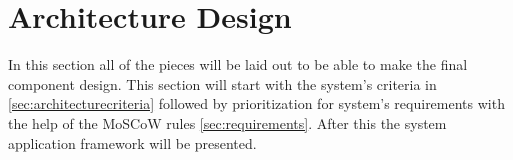 \section{Architecture Design} \label{sec:architecturedesign}
In this section all of the pieces will be laid out to be able to make the final component design.
This section will start with the system's criteria in \cref{sec:architecturecriteria} followed by prioritization for system's requirements with the help of the MoSCoW rules \cref{sec:requirements}.
After this the system application framework will be presented.



%




